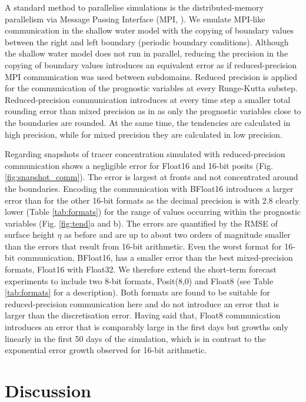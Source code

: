 A standard method to parallelise simulations is the distributed-memory parallelism via Message Passing Interface (MPI, \cite{TheMPIForum1993}).
We emulate MPI-like communication in the shallow water model with the copying of boundary values between the right and left boundary (periodic
boundary conditions). Although the shallow water model does not run in parallel, reducing the precision in the copying of boundary values
introduces an equivalent error as if reduced-precision MPI communication was used between subdomains. Reduced precision is applied
for the communication of the prognostic variables at every Runge-Kutta substep. Reduced-precision communication introduces at every time
step a smaller total rounding error than mixed precision as in \label{sec:swm_results_mixed} as only the prognostic variables close to the
boundaries are rounded. At the same time, the tendencies are calculated in high precision, while for mixed precision they are calculated in
low precision. 

Regarding snapshots of tracer concentration simulated with reduced-precision communication shows a negligible error for Float16 and
16-bit posits (Fig. \ref{fig:snapshot_comm}). The error is largest at fronts and not concentrated around the boundaries. Encoding the
communication with BFloat16 introduces a larger error than for the other 16-bit formats as the decimal precision is with 2.8 clearly lower
(Table \ref{tab:formats}) for the range of values occurring within the prognostic variables (Fig. \ref{fig:tend}a and b). The errors are quantified
by the RMSE of surface height $\eta$ as before and are up to about two orders of magnitude smaller than the errors that result from 16-bit arithmetic.
Even the worst format for 16-bit communication, BFloat16, has a smaller error than the best mixed-precision formats, Float16 with Float32.
We therefore extend the short-term forecast experiments to include two 8-bit formats, Posit(8,0) and Float8 (see Table \ref{tab:formats} for
a description). Both formats are found to be suitable for reduced-precision communication here and do not introduce an error that is larger than the
discretisation error. Having said that, Float8 communication introduces an error that is comparably large in the first days but growths only
linearly in the first 50 days of the simulation, which is in contrast to the exponential error growth observed for 16-bit arithmetic.

\section{Discussion}
\label{sec:swm_discussion}

